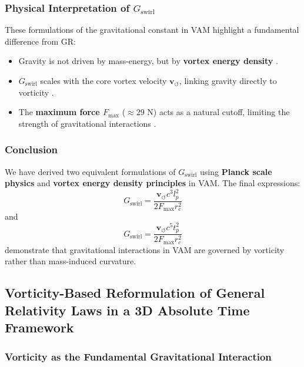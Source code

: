 \documentclass[a4paper,10pt]{article}
\begin{document}
\subsubsection*{Physical Interpretation of \(  G_\text{swirl} \)}
These formulations of the gravitational constant in VAM highlight a fundamental difference from GR:
\begin{itemize}
    \item Gravity is not driven by mass-energy, but by \textbf{vortex energy density} \cite{barcelo_superfluid}.
    \item \(  G_\text{swirl} \) scales with the core vortex velocity \( \mathbf{v}_{\scriptscriptstyle\boldsymbol{\circlearrowleft}} \), linking gravity directly to vorticity \cite{moffatt_helicity}.
    \item The \textbf{maximum force \( F_{\max} \)} ($\approx 29$ N) acts as a natural cutoff, limiting the strength of gravitational interactions \cite{schiller_max_force}.
\end{itemize}

\subsubsection*{Conclusion}
We have derived two equivalent formulations of \(  G_\text{swirl} \) using \textbf{Planck scale physics} and \textbf{vortex energy density principles} in VAM. The final expressions:
\begin{equation*}
     G_\text{swirl} = \frac{\mathbf{v}_{\scriptscriptstyle\boldsymbol{\circlearrowleft}} c^3 l_p^2}{2 F_{\max} r_c^2}
\end{equation*}
and
\begin{equation*}
     G_\text{swirl} = \frac{\mathbf{v}_{\scriptscriptstyle\boldsymbol{\circlearrowleft}} c^5 t_p^2}{2 F_{\max} r_c^2}
\end{equation*}
demonstrate that gravitational interactions in VAM are governed by vorticity rather than mass-induced curvature.

    
\subsection{Vorticity-Based Reformulation of General Relativity Laws in a 3D Absolute Time Framework}

\subsubsection*{Vorticity as the Fundamental Gravitational Interaction}
\end{document}

